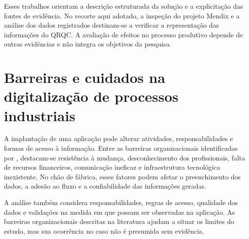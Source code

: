 Esses trabalhos orientam a descrição estruturada da solução e a explicitação das fontes de evidência. No recorte aqui adotado, a inspeção do projeto Mendix e a análise dos dados registrados destinam-se a verificar a representação das informações do QRQC. A avaliação de efeitos no processo produtivo depende de outras evidências e não integra os objetivos da pesquisa.

\section{Barreiras e cuidados na digitalização de processos industriais}

A implantação de uma aplicação pode alterar atividades, responsabilidades e formas de acesso à informação. Entre as barreiras organizacionais identificadas por , destacam-se resistência à mudança, desconhecimento dos profissionais, falta de recursos financeiros, comunicação ineficaz e infraestrutura tecnológica inexistente. No chão de fábrica, esses fatores podem afetar o preenchimento dos dados, a adesão ao fluxo e a confiabilidade das informações geradas.

A análise também considera responsabilidades, regras de acesso, qualidade dos dados e validações na medida em que possam ser observadas na aplicação. As barreiras organizacionais descritas na literatura ajudam a situar os limites do estudo, mas sua ocorrência no caso não é presumida sem evidência.
